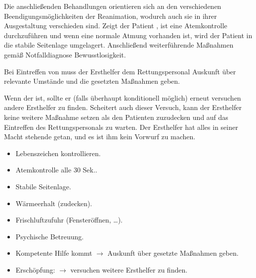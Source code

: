 {%
Die anschließenden Behandlungen orientieren sich an den
verschiedenen Beendigungsmöglichkeiten der
Reanimation, wodurch auch sie in ihrer Ausgestaltung verschieden sind. Zeigt
der Patient , ist eine
Atemkontrolle durchzuführen und wenn eine normale Atmung
vorhanden ist, wird der Patient in die stabile Seitenlage umgelagert.
Anschließend weiterführende Maßnahmen gemäß Notfalldiagnose Bewusstlosigkeit. 

Bei Eintreffen von  muss der Ersthelfer
dem Rettungspersonal Auskunft über relevante Umstände und
die gesetzten Maßnahmen geben. 

Wenn der  ist, sollte er (falls überhaupt
konditionell möglich) erneut versuchen andere  Ersthelfer zu
finden. Scheitert auch dieser Versuch, kann der Ersthelfer keine weitere 
Maßnahme setzen als den Patienten zuzudecken und auf das
Eintreffen des  Rettungspersonals zu warten. Der Ersthelfer hat alles
in seiner Macht stehende getan, und es ist ihm kein Vorwurf
zu machen. 
}{
\begin{itemize}
  \item Lebenszeichen kontrollieren.
  \item Atemkontrolle alle 30 Sek..
  \item Stabile Seitenlage.
  \item Wärmeerhalt (zudecken).
  \item Frischluftzufuhr (Fensteröffnen, \ldots).
  \item Psychische Betreuung.
  \item Kompetente Hilfe kommt ${\rightarrow}$ Auskunft über gesetzte
  Maßnahmen geben.
  \item Erschöpfung: ${\rightarrow}$ versuchen weitere Ersthelfer zu
  finden.
\end{itemize}

}{}{}{}




% 
% 

% 

